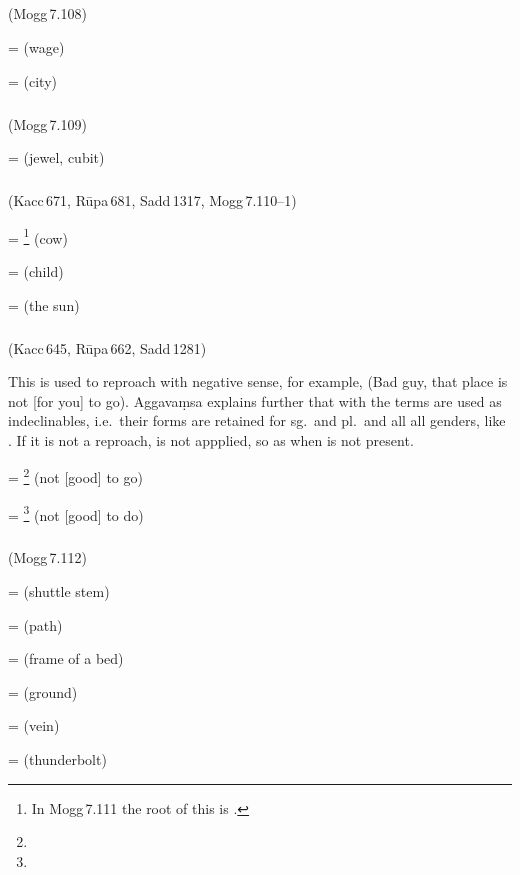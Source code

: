 \subparagraph*{} (Mogg\,7.108)\label{pacckx:tana}

 =  (wage)\par
{} =  (city)\par

\subparagraph*{} (Mogg\,7.109)\label{pacckx:tanaka}

 =  (jewel, cubit)\par

\subparagraph*{} (Kacc\,671, R\=upa\,681, Sadd\,1317, Mogg\,7.110--1)\label{pacckx:nu}\label{pacckx:nuka}

 = \footnote{In Mogg\,7.111 the root of this is .} (cow)\par
{} =  (child)\par
{} =  (the sun)\par

\subparagraph*{} (Kacc\,645, R\=upa\,662, Sadd\,1281)\label{pacckx:aani}

This  is used to reproach with negative sense, for example,  (Bad guy, that place is not [for you] to go). Aggava\d msa explains further that with  the terms are used as indeclinables, i.e.\ their forms are retained for sg.\ and pl.\ and all all genders, like . If it is not a reproach,  is not appplied, so as when  is not present.

 = \footnote{} (not [good] to go)\par
{} = \footnote{} (not [good] to do)\par

\subparagraph*{} (Mogg\,7.112)\label{pacckx:ani}

 =  (shuttle stem)\par
{} =  (path)\par
{} =  (frame of a bed)\par
{} =  (ground)\par
{} =  (vein)\par
{} =  (thunderbolt)\par

